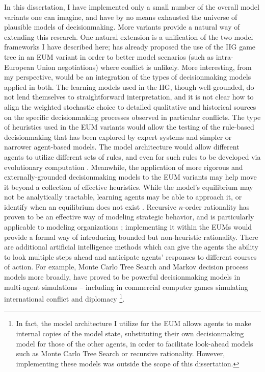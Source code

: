 In this dissertation, I have implemented only a small number of the overall model variants one can imagine, and have by no means exhausted the universe of plausible models of decisionmaking. More variants provide a natural way of extending this research. One natural extension is a unification of the two model frameworks I have described here; \citet{bdm_2011} has already proposed the use of the IIG game tree in an EUM variant in order to better model scenarios (such as intra-European Union negotiations) where conflict is unlikely. More interesting, from my perspective, would be an integration of the types of decisionmaking models applied in both. The learning models used in the IIG, though well-grounded, do not lend themselves to straightforward interpretation, and it is not clear how to align the weighted stochastic choice to detailed qualitative and historical sources on the specific decisionmaking processes observed in particular conflicts. The type of heuristics used in the EUM variants would allow the testing of the rule-based decisionmaking that has been explored by expert systems \citep{taber_1992} and simpler \citep{cederman_1997} or narrower \citep{hudson_2004} agent-based models. The model architecture would allow different agents to utilize different sets of rules, and even for such rules to be developed via evolutionary computation \citep{axelrod_2006}. Meanwhile, the application of more rigorous and externally-grounded decisionmaking models to the EUM variants may help move it beyond a collection of effective heuristics. While the model's equilibrium may not be analytically tractable, learning agents may be able to approach it, or identify when an equilibrium does not exist \citep{galla_2013}. Recursive $n$-order rationality has proven to be an effective way of modeling strategic behavior, and is particularly applicable to modeling organizations \citep{latek_2009}; implementing it within the EUMs would provide a formal way of introducing bounded but non-heuristic rationality. There are additional artificial intelligence methods which can give the agents the ability to look multiple steps ahead and anticipate agents' responses to different courses of action. For example, Monte Carlo Tree Search \citep{chaslot_2008} and Markov decision process models more broadly, have proved to be powerful decisionmaking models in multi-agent simulations -- including in commercial computer games simulating international conflict and diplomacy \citep{champandard_2014}\footnote{In fact, the model architecture I utilize for the EUM allows agents to make internal copies of the model state, substituting their own decisionmaking model for those of the other agents, in order to facilitate look-ahead models such as Monte Carlo Tree Search or recursive rationality. However, implementing these models was outside the scope of this dissertation.}.

